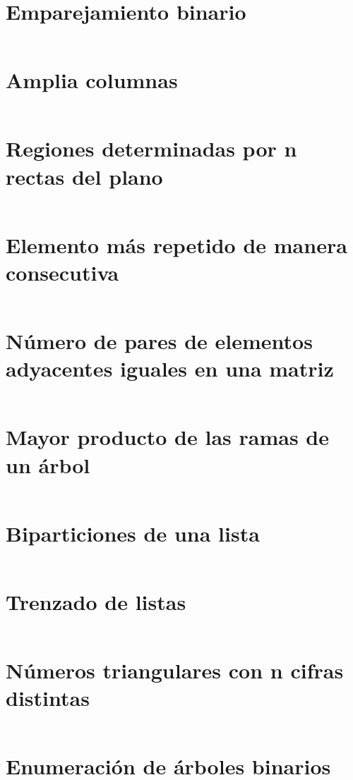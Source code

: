 \documentclass[a4paper,12pt,twoside]{book}
\newcommand{\ejercicio}[1]{\inputminted[firstline=7]{haskell}{../src/#1.hs}}
\begin{document}
\chapter{Emparejamiento binario}
\ejercicio{Emparejamiento_binario}

\chapter{Amplia columnas}
\ejercicio{Amplia_columnas}

\chapter{Regiones determinadas por n rectas del plano}
\ejercicio{Regiones}

\chapter{Elemento más repetido de manera consecutiva}
\ejercicio{Mas_repetido}

\chapter{Número de pares de elementos adyacentes iguales en una matriz}
\ejercicio{Pares_adyacentes_iguales}

\chapter{Mayor producto de las ramas de un árbol}
\ejercicio{Mayor_producto_de_las_ramas_de_un_arbol}

\chapter{Biparticiones de una lista}
\ejercicio{Biparticiones_de_una_lista}

\chapter{Trenzado de listas}
\ejercicio{Trenzado_de_listas}

\chapter{Números triangulares con n cifras distintas}
\ejercicio{Triangulares_con_cifras}

\chapter{Enumeración de árboles binarios}
\ejercicio{Enumera_arbol}
\end{document}
